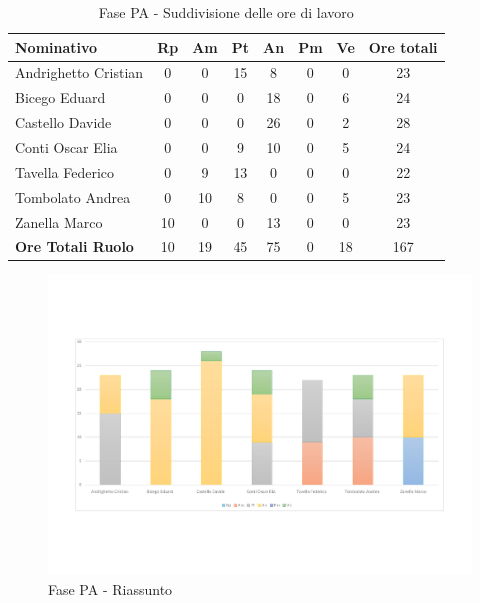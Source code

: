 \documentclass[../PianoProgetto.tex]{subfiles}
\begin{document}
	\begin{table}[H]
		\centering
	
		\begin{tabularx}{\textwidth}{l  * {6}{C}  c}
			\toprule
			\textbf{Nominativo} & \textbf{Rp} & \textbf{Am} & \textbf{Pt} 
						& \textbf{An} & \textbf{Pm} & \textbf{Ve} & \textbf{Ore totali} \\
			\midrule
			Andrighetto Cristian  & 0 & 0 & 15 & 8 & 0 & 0 & 23 \\
			Bicego Eduard  & 0 & 0 & 0 & 18 & 0 & 6 & 24 \\
			Castello Davide  & 0 & 0 & 0 & 26 & 0 & 2 & 28 \\
			Conti Oscar Elia  & 0 & 0 & 9 & 10 & 0 & 5 & 24 \\
			Tavella Federico  & 0 & 9 & 13 & 0 & 0 & 0 & 22 \\
			Tombolato Andrea  & 0 & 10 & 8 & 0 & 0 & 5 & 23 \\
			Zanella Marco & 10 & 0 & 0 & 13 & 0 & 0 & 23 \\
			\midrule
			\textbf{Ore Totali Ruolo} & 10 & 19 & 45 & 75 & 0 & 18 & 167 \\
			\bottomrule
		\end{tabularx}
		\caption{Fase PA - Suddivisione delle ore di lavoro}
		\label{tab:fasePA_ore}
	\end{table}
\vfill	
	
	\begin{figure}[H]
		\centering
		\includegraphics[width=\textwidth , trim=2cm 4cm 2cm 4cm]{grafici/PA/PA-ore-persona}
			\caption{Fase PA - Riassunto}
		\label{fig:BarChart-fasePA_ore}
	\end{figure}
\vfill	
\newpage
	
\end{document}
